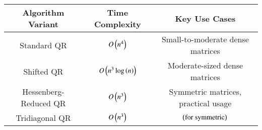 \begin{tabular}{|c|c|c|} 
        \hline
            Algorithm Variant & Time Complexity	& Key Use Cases \\
        \hline
            Standard QR & $O\left(n^4\right)$ & Small-to-moderate dense matrices \\
        \hline
            Shifted QR & $O\left(n^3\log\left(n\right)\right)$ & Moderate-sized dense matrices \\
        \hline
            Hessenberg-Reduced QR & $O\left(n^3\right)$ & Symmetric matrices, practical usage \\
        \hline
            Tridiagonal QR & $O\left(n^3\right)$ & $\left(\text{for symmetric}\right)$ \\
        \hline
\end{tabular}

